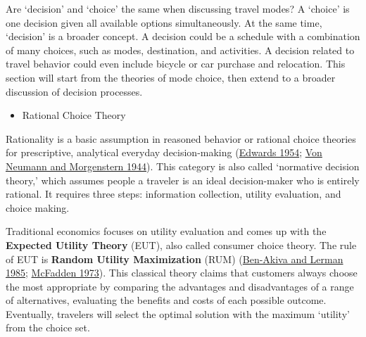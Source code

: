 \documentclass[
  12pt,
]{article}
\providecommand{\tightlist}{%
  \setlength{\itemsep}{0pt}\setlength{\parskip}{0pt}}
\begin{document}
Are `decision' and `choice' the same when discussing travel modes? A `choice' is one decision given all available options simultaneously. At the same time, `decision' is a broader concept. A decision could be a schedule with a combination of many choices, such as modes, destination, and activities. A decision related to travel behavior could even include bicycle or car purchase and relocation. This section will start from the theories of mode choice, then extend to a broader discussion of decision processes.

\begin{itemize}
\tightlist
\item
  Rational Choice Theory
\end{itemize}

Rationality is a basic assumption in reasoned behavior or rational choice theories for prescriptive, analytical everyday decision-making (\protect\hyperlink{ref-edwardsTheoryDecisionMaking1954}{Edwards 1954}; \protect\hyperlink{ref-vonneumannTheoryGamesEconomic1944}{Von Neumann and Morgenstern 1944}). This category is also called `normative decision theory,' which assumes people a traveler is an ideal decision-maker who is entirely rational. It requires three steps: information collection, utility evaluation, and choice making.

Traditional economics focuses on utility evaluation and comes up with the \textbf{Expected Utility Theory} (EUT), also called consumer choice theory. The rule of EUT is \textbf{Random Utility Maximization} (RUM) (\protect\hyperlink{ref-ben-akivaDiscreteChoiceAnalysis1985}{Ben-Akiva and Lerman 1985}; \protect\hyperlink{ref-mcfaddenConditionalLogitAnalysis1973}{McFadden 1973}). This classical theory claims that customers always choose the most appropriate by comparing the advantages and disadvantages of a range of alternatives, evaluating the benefits and costs of each possible outcome. Eventually, travelers will select the optimal solution with the maximum `utility' from the choice set.
\end{document}
